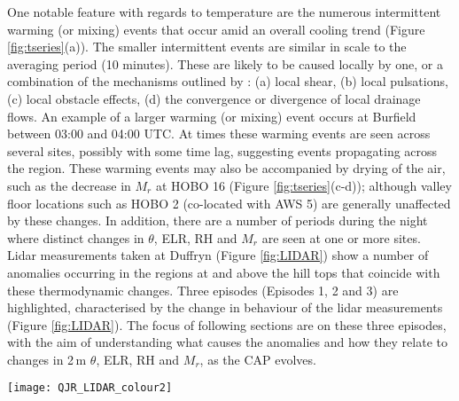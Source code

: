 \documentclass[times]{qjrms4}
\begin{document}
One notable feature with regards to temperature are the numerous intermittent warming (or mixing) events that occur amid an overall cooling trend (Figure \ref{fig:tseries}(a)). The smaller intermittent events are similar in scale to the averaging period (10 minutes). These are likely to be caused locally by one, or a combination of the mechanisms outlined by \citet{banta2004nocturnal}: (a) local shear, (b) local pulsations, (c) local obstacle effects, (d) the convergence or divergence of local drainage flows. An example of a larger warming (or mixing) event occurs at Burfield between 03:00 and 04:00 UTC. At times these warming events are seen across several sites, possibly with some time lag, suggesting events propagating across the region. These warming events may also be accompanied by drying of the air, such as the decrease in $M_r$ at HOBO 16 (Figure \ref{fig:tseries}(c-d)); although valley floor locations such as HOBO 2 (co-located with AWS 5) are generally unaffected by these changes. In addition, there are a number of periods during the night where distinct changes in $\theta$, ELR, RH and $M_r$ are seen at one or more sites. Lidar measurements taken at Duffryn (Figure \ref{fig:LIDAR}) show a number of anomalies occurring in the regions at and above the hill tops that coincide with these thermodynamic changes. Three episodes (Episodes 1, 2 and 3) are highlighted, characterised by the change in behaviour of the lidar measurements (Figure \ref{fig:LIDAR}). The focus of following sections are on these three episodes, with the aim of understanding what causes the anomalies and how they relate to changes in 2$\,\mbox{m}$ $\theta$, ELR, RH and $M_r$, as the CAP evolves.
       \begin{figure*}
        \centering
        \texttt{[image: QJR\_LIDAR\_colour2]}
        \caption{Time series of NCAS lidar measurements taken at Duffryn showing vertical profiles of (a) vertical velocity and (b) backscatter. The vertical dashed lines indicate local sunrise. The horizontal dot-dashed line marks the mean hilltop height.}
	\label{fig:LIDAR}
        \end{figure*}
\end{document}

